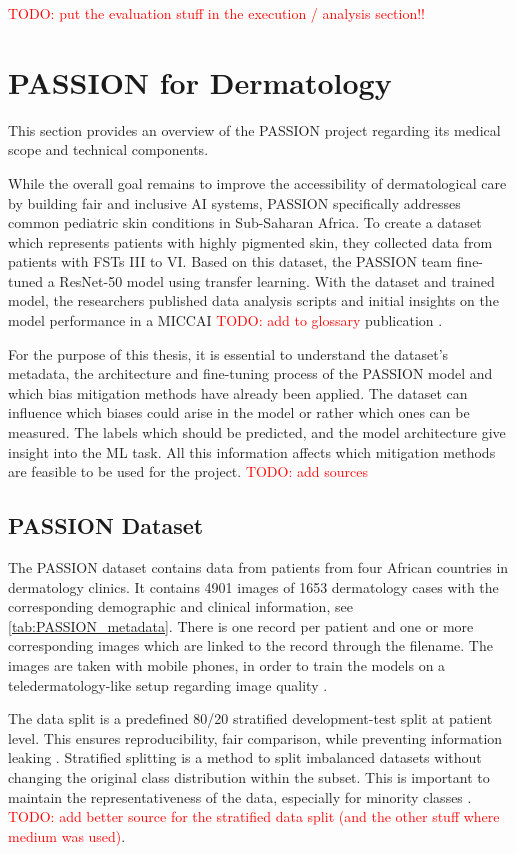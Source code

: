 \documentclass[12pt, a4paper, oneside]{book}   	%
\renewcommand{\todo}[1]{\textcolor{red}{TODO: #1}}
\begin{document}
		
		\todo{put the evaluation stuff in the execution / analysis section!!}
		
		
		\section{PASSION for Dermatology}
			This section provides an overview of the PASSION project regarding its medical scope and technical components.
			
			While the overall goal remains to improve the accessibility of dermatological care by building fair and inclusive AI systems, PASSION specifically addresses common \gls{pediatric} skin conditions in Sub-Saharan Africa. To create a dataset which represents patients with highly pigmented skin, they collected data from patients with \glspl{FST} III to VI. Based on this dataset, the PASSION team fine-tuned a ResNet-50 model using transfer learning. With the dataset and trained model, the researchers published data analysis scripts and initial insights on the model performance in a MICCAI \todo{add to glossary} publication \autocite{Gottfrois2024}.
			
			For the purpose of this thesis, it is essential to understand the dataset's metadata, the architecture and fine-tuning process of the PASSION model and which bias mitigation methods have already been applied. The dataset can influence which biases could arise in the model or rather which ones can be measured. The labels which should be predicted, and the model architecture give insight into the \gls{ML} task. All this information affects which mitigation methods are feasible to be used for the project. \todo{add sources}
			
			\subsection{PASSION Dataset}
				The PASSION dataset contains data from patients from four African countries in dermatology clinics. It contains 4901 images of 1653 dermatology cases with the corresponding demographic and clinical information, see \autoref{tab:PASSION_metadata}. There is one record per patient and one or more corresponding images which are linked to the record through the filename. The images are taken with mobile phones, in order to train the models on a \gls{teledermatology}-like setup regarding image quality \autocite{Gottfrois2024}.
				
			    The data split is a predefined 80/20 stratified development-test split at patient level. This ensures reproducibility, fair comparison, while preventing information leaking \autocite{Gottfrois2024}. Stratified splitting is a method to split imbalanced datasets without changing the original class distribution within the subset. This is important to maintain the representativeness of the data, especially for minority classes \autocite{Balde_2023}. \todo{add better source for the stratified data split (and the other stuff where medium was used)}.
			    
\end{document}
